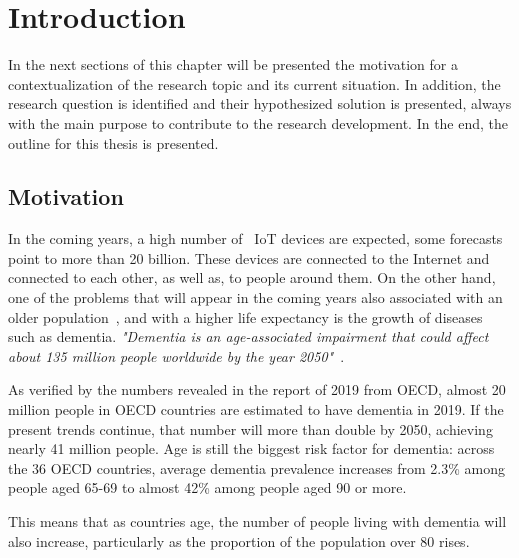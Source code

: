 \newcommand{\novathesis}{\emph{novathesis}}
\newcommand{\novathesisclass}{\texttt{novathesis.cls}}


\chapter{Introduction}
\label{cha:introduction}

In the next sections of this chapter will be presented the motivation for a contextualization of the research topic and its current situation. In addition, the research question is identified and their hypothesized solution is presented, always with the main purpose to contribute to the research development. In the end, the outline for this thesis is presented.


\section{Motivation} %
\label{sec:motivation}


In the coming years, a high number of ~\gls{IoT} devices are expected, some forecasts point to more than 20 billion. These devices are connected to the Internet and connected to each other, as well as, to people around them. On the other hand, one of the problems that will appear in the coming years also associated with an older population~\cite{pordata_pt,pordata_EU}, and with a higher life expectancy is the growth of diseases such as dementia.
\textit{"Dementia is an age-associated impairment that could affect about 135 million people worldwide by the year 2050"}~\cite{Hammoud2018}.

As verified by the numbers revealed in the report of 2019 from OECD, almost 20 million people in OECD countries are estimated to have dementia in 2019. If the present trends continue, that number will more than double by 2050, achieving nearly 41 million people. Age is still the biggest risk factor for dementia: across the 36 OECD countries, average dementia prevalence increases from 2.3\% among people aged 65-69 to almost 42\% among people aged 90 or more.

This means that as countries age, the number of people living with dementia will also increase, particularly as the proportion of the population over 80 rises. 

